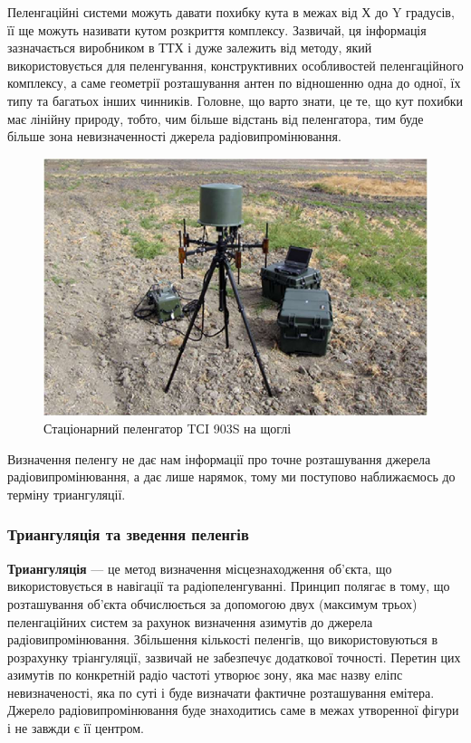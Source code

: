 \documentclass{article}
\begin{document}
Пеленгаційні системи можуть давати похибку кута в межах від Х до Y градусів, її ще можуть називати кутом розкриття комплексу. Зазвичай, ця інформація зазначається виробником в ТТХ і дуже залежить від методу, який використовується для пеленгування,  конструктивних особливостей пеленгаційного комплексу, а саме геометрії розташування антен по відношенню одна до одної, їх типу та багатьох інших чинників. Головне, що варто знати, це те, що кут похибки має лінійну природу, тобто, чим більше відстань від пеленгатора, тим буде більше зона невизначенності джерела радіовипромінювання.

\begin{figure}[H]
	\centering
	\includegraphics[width=0.8\linewidth]{images/tsi.png}
	\caption{\label{fig:tsi} Стаціонарний пеленгатор TСI 903S на щоглі}
\end{figure}

 
Визначення пеленгу не дає нам інформації про точне розташування джерела радіовипромінювання, а дає лише нарямок, тому ми поступово наближаємось до терміну триангуляції.  

\subsubsection{Триангуляція та зведення пеленгів}
\textbf{Триангуляція} --- це метод визначення місцезнаходження об'єкта, що використовується в навігації та радіопеленгуванні. Принцип полягає в тому, що розташування об'єкта обчислюється за допомогою двух (максимум трьох) пеленгаційних систем за рахунок визначення азимутів до джерела радіовипромінювання. Збільшення кількості пеленгів, що використовуються в розрахунку тріангуляції, зазвичай не забезпечує додаткової точності. Перетин цих азимутів по конкретній радіо частоті утворює зону, яка має назву еліпс невизначеності, яка по суті і буде визначати фактичне розташування емітера. Джерело радіовипромінювання буде знаходитись саме в межах утворенної фігури і не завжди є її центром. 
\end{document}

